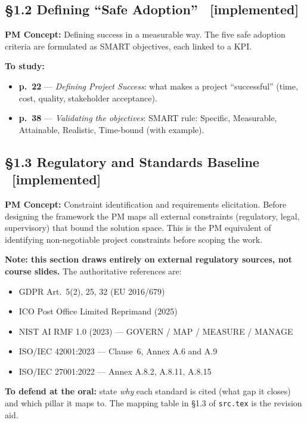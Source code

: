 \documentclass[12pt,a4paper]{article}
\newcommand{\statusdone}{\textcolor{donegreen}{\small\textbf{[implemented]}}}
\newcommand{\slide}[3]{\item \textbf{p.~#1} --- \textit{#2}: #3}
\newcommand{\concetto}[1]{\textbf{PM Concept:} #1\par\vspace{2pt}}
\begin{document}
\subsection{\S1.2 Defining ``Safe Adoption'' \ \statusdone}
\concetto{Defining success in a measurable way. The five safe adoption criteria are formulated as SMART objectives, each linked to a KPI.}
\textbf{To study:}
\begin{itemize}
  \slide{22}{Defining Project Success}{what makes a project ``successful'' (time, cost, quality, stakeholder acceptance).}
  \slide{38}{Validating the objectives}{SMART rule: Specific, Measurable, Attainable, Realistic, Time-bound (with example).}
\end{itemize}

\subsection{\S1.3 Regulatory and Standards Baseline \ \statusdone}
\concetto{Constraint identification and requirements elicitation. Before designing the framework the PM maps all external constraints (regulatory, legal, supervisory) that bound the solution space. This is the PM equivalent of identifying non-negotiable project constraints before scoping the work.}
\textbf{Note: this section draws entirely on external regulatory sources, not course slides.} The authoritative references are:
\begin{itemize}
  \item GDPR Art.~5(2), 25, 32 (EU 2016/679)
  \item ICO Post Office Limited Reprimand (2025)
  \item NIST AI RMF 1.0 (2023) --- GOVERN / MAP / MEASURE / MANAGE
  \item ISO/IEC 42001:2023 --- Clause~6, Annex A.6 and A.9
  \item ISO/IEC 27001:2022 --- Annex A.8.2, A.8.11, A.8.15
\end{itemize}
\textbf{To defend at the oral:} state \emph{why} each standard is cited (what gap it closes) and which pillar it maps to. The mapping table in \S1.3 of \texttt{src.tex} is the revision aid.

\end{document}
